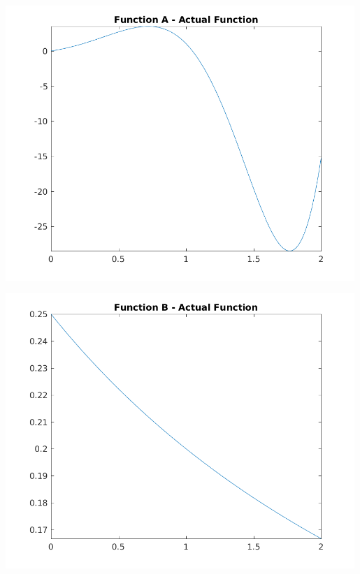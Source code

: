 \documentclass{article}
\begin{document}
 
\begin{center}
    \centering
    \begin{minipage}{0.5\textwidth}
        \centering
        \includegraphics[width=0.99\textwidth]{../output/a_actual.png}
    \end{minipage}\hfill
    \begin{minipage}{0.5\textwidth}
        \centering
        \includegraphics[width=0.99\textwidth]{../output/b_actual.png}
    \end{minipage}
	\label{fig:true}

\end{center}
\end{document}
